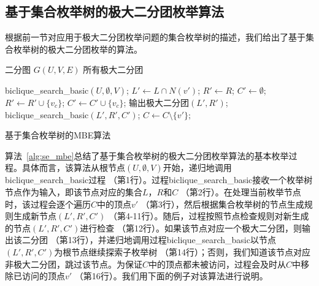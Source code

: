 \subsection{基于集合枚举树的极大二分团枚举算法}
\label{subsec:algorithm}
根据前一节对应用于极大二分团枚举问题的集合枚举树的描述，我们给出了基于集合枚举树的极大二分团枚举的算法。

\begin{algorithm}[H]
    \begin{algorithmic}[1]
        \normalsize
        \REQUIRE 二分图 $G(U,V,E)$
        \ENSURE 所有极大二分团
        
        \renewcommand{\algorithmicwhile}{\textbf{procedure}}
        \renewcommand{\algorithmicdo}{\textbf{:}}


        \STATE \textsf{biclique\_search\_basic}$(U,\emptyset,V)$;
        \renewcommand{\algorithmicdo}{\textbf{do}}
            \STATE $L' \leftarrow L \cap N(v')$; $R'\leftarrow R$; $C' \leftarrow \emptyset$;
                \STATE $R' \leftarrow R' \cup \{v_c\}$;
                \STATE $C' \leftarrow C' \cup \{v_c\}$;
              \ENDIF
            \ENDFOR
              \STATE 输出极大二分团$(L', R')$;
              \STATE \textsf{biclique\_search\_basic}$(L',R',C')$;
            \ENDIF
            \STATE $C \leftarrow C \setminus \{v'\}; $
          \ENDFOR

        \ENDWHILE

    \end{algorithmic}
    \caption{基于集合枚举树的MBE算法}
    \label{alg:se_mbe}
\end{algorithm}

算法~\ref{alg:se_mbe}总结了基于集合枚举树的极大二分团枚举算法的基本枚举过程。具体而言，该算法从根节点$(U,\emptyset,V)$开始，递归地调用\textsf{biclique\_search\_basic}过程 （第1行）。过程\textsf{biclique\_search\_basic}接收一个枚举树节点作为输入，即该节点对应的集合$L$，$R$和$C$ （第2行）。在处理当前枚举节点时，该过程会逐个遍历$C$中的顶点$v'$ （第3行），然后根据集合枚举树的节点生成规则生成新节点$(L',R',C')$ （第4-11行）。随后，过程按照节点检查规则对新生成的节点$(L',R',C')$进行检查 （第12行）。如果该节点对应一个极大二分团，则输出该二分团 （第13行），并递归地调用过程\textsf{biclique\_search\_basic}以节点$(L',R',C')$为根节点继续探索子枚举树 （第14行）；否则，我们知道该节点对应非极大二分团，跳过该节点。为保证$C$中的顶点都未被访问，过程会及时从$C$中移除已访问的顶点$v'$ （第16行）。我们用下面的例子对该算法进行说明。


